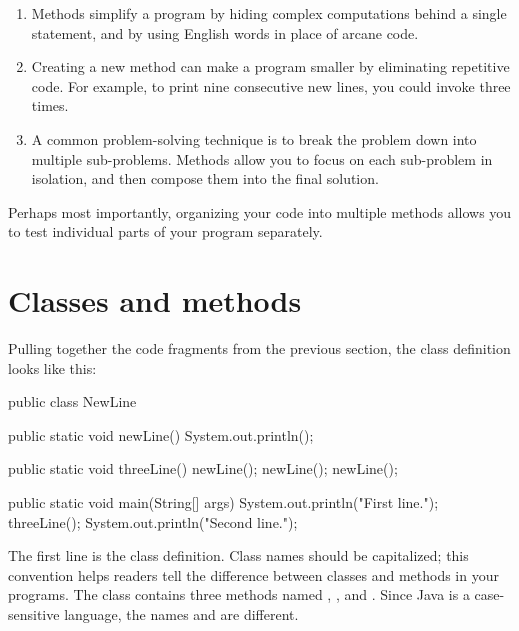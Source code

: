 \begin{enumerate}

\item
Methods simplify a program by hiding complex computations behind a single statement, and by using English words in place of arcane code.

\item Creating a new method can make a program smaller by eliminating repetitive code.
For example, to print nine consecutive new lines, you could invoke  three times.

\item A common problem-solving technique is to break the problem down into multiple sub-problems.
Methods allow you to focus on each sub-problem in isolation, and then compose them into the final solution.

\end{enumerate}


Perhaps most importantly, organizing your code into multiple methods allows you to test individual parts of your program separately.


\section{Classes and methods}


Pulling together the code fragments from the previous section, the class definition looks like this:

\begin{code}
public class NewLine {

    public static void newLine() {
        System.out.println();
    }

    public static void threeLine() {
        newLine();
        newLine();
        newLine();
    }

    public static void main(String[] args) {
        System.out.println("First line.");
        threeLine();
        System.out.println("Second line.");
    }
}
\end{code}

The first line is the class definition.
Class names should be capitalized; this convention helps readers tell the difference between classes and methods in your programs.
The  class contains three methods named , , and .
Since Java is a case-sensitive language, the names  and  are different.


